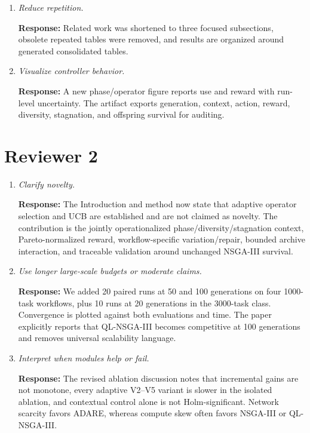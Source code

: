 \documentclass[11pt]{article}
\newcommand{\response}[1]{\par\smallskip\noindent\textcolor{blue!55!black}{\textbf{Response:} #1}\par\medskip}
\begin{document}
\begin{enumerate}
\item \emph{Reduce repetition.}
\response{Related work was shortened to three focused subsections, obsolete repeated tables were removed, and results are organized around generated consolidated tables.}

\item \emph{Visualize controller behavior.}
\response{A new phase/operator figure reports use and reward with run-level uncertainty. The artifact exports generation, context, action, reward, diversity, stagnation, and offspring survival for auditing.}
\end{enumerate}

\section*{Reviewer 2}
\begin{enumerate}
\item \emph{Clarify novelty.}
\response{The Introduction and method now state that adaptive operator selection and UCB are established and are not claimed as novelty. The contribution is the jointly operationalized phase/diversity/stagnation context, Pareto-normalized reward, workflow-specific variation/repair, bounded archive interaction, and traceable validation around unchanged NSGA-III survival.}

\item \emph{Use longer large-scale budgets or moderate claims.}
\response{We added 20 paired runs at 50 and 100 generations on four 1000-task workflows, plus 10 runs at 20 generations in the 3000-task class. Convergence is plotted against both evaluations and time. The paper explicitly reports that QL-NSGA-III becomes competitive at 100 generations and removes universal scalability language.}

\item \emph{Interpret when modules help or fail.}
\response{The revised ablation discussion notes that incremental gains are not monotone, every adaptive V2--V5 variant is slower in the isolated ablation, and contextual control alone is not Holm-significant. Network scarcity favors ADARE, whereas compute skew often favors NSGA-III or QL-NSGA-III.}
\end{enumerate}
\end{document}
